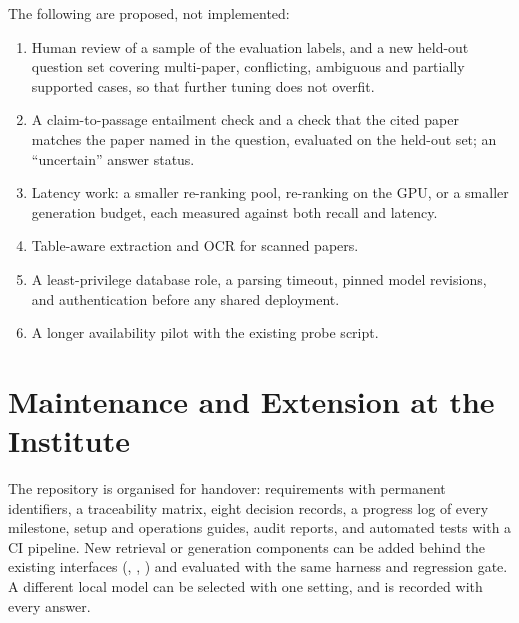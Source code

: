 The following are proposed, not implemented:
\begin{enumerate}
  \item Human review of a sample of the evaluation labels, and a new held-out question set covering multi-paper,
        conflicting, ambiguous and partially supported cases, so that further tuning does not overfit.
  \item A claim-to-passage entailment check and a check that the cited paper matches the paper named in the
        question, evaluated on the held-out set; an ``uncertain'' answer status.
  \item Latency work: a smaller re-ranking pool, re-ranking on the GPU, or a smaller generation budget, each measured
        against both recall and latency.
  \item Table-aware extraction and OCR for scanned papers.
  \item A least-privilege database role, a parsing timeout, pinned model revisions, and authentication before any
        shared deployment.
  \item A longer availability pilot with the existing probe script.
\end{enumerate}

\section{Maintenance and Extension at the Institute}

The repository is organised for handover: requirements with permanent identifiers, a traceability matrix, eight
decision records, a progress log of every milestone, setup and operations guides, audit reports, and automated
tests with a CI pipeline. New retrieval or generation components can be added behind the existing interfaces
(, , ) and evaluated with the same harness and
regression gate. A different local model can be selected with one setting, and is recorded with every answer.
